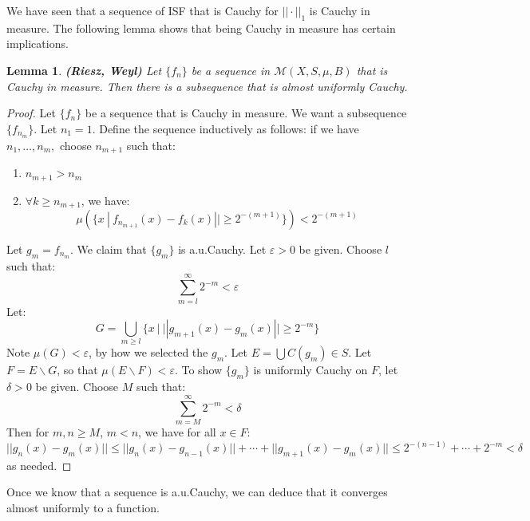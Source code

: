 \documentclass[a4paper,12pt]{report}
\newcommand{\ms}[1]{\mathscr{#1}}
\newcommand{\varep}{ \varepsilon }
\newtheorem{lemma}[theorem]{Lemma}
\begin{document}
	\noindent We have seen that a sequence of ISF that is Cauchy for $||\cdot||_1$ is Cauchy in measure. The following lemma shows that being Cauchy in measure has certain implications.  
	
	\begin{lemma}
	\emph{\textbf{(Riesz, Weyl)}}
	Let $\{f_n\}$ be a sequence in $\ms{M}(X, S, \mu, B)$ that is Cauchy in measure. Then there is a subsequence that is almost uniformly Cauchy. 
	\end{lemma}	
	\begin{proof}
	Let $\{f_n\}$ be a sequence that is Cauchy in measure. We want a subsequence $\{f_{n_m}\}$. Let $n_1 = 1$. Define the sequence inductively as follows: if we have $n_1, \ldots, n_m,$ choose $n_{m+1}$ such that:
	\begin{enumerate}[label=(\alph*)]
		\item $n_{m+1} > n_m$
		\item $\forall k \geq n_{m+1}$, we have:
		\[ \mu \left(\{x ~|~ f_{n_{m+1}}(x) - f_k(x)|| \geq 2^{-(m+1)} \} \right) < 2^{-(m+1)} \]
	\end{enumerate}
	Let $g_m = f_{n_m}$. We claim that $\{g_m\}$ is a.u.Cauchy. Let $\varep > 0$ be given. Choose $l$ such that:
	\[ \sum_{m=l}^\infty 2^{-m} < \varep \]
	Let:
	\[ G = \bigcup_{m \geq l} \{x ~|~ ||g_{m+1}(x) - g_m(x)|| \geq 2^{-m} \} \]
	Note $\mu(G) < \varep$, by how we selected the $g_m$. Let $E = \bigcup C(g_m) \in S$. Let $F = E \backslash G$, so that $\mu(E \backslash F) < \varep$. To show $\{g_m\}$ is uniformly Cauchy on $F$, let $\delta > 0$ be given. Choose $M$ such that:
	\[ \sum_{m=M}^\infty 2^{-m} < \delta \]
	Then for $m, n \geq M$, $m < n$, we have for all $x \in F$:
	\[ ||g_n(x) - g_m(x)|| \leq ||g_n(x) - g_{n-1}(x)|| + \cdots + ||g_{m+1}(x) - g_m(x)|| \leq 2^{-(n-1)} + \cdots + 2^{-m} < \delta \]
	as needed. 
	\end{proof}
	
	\noindent Once we know that a sequence is a.u.Cauchy, we can deduce that it converges almost uniformly to a function.
	
\end{document}
